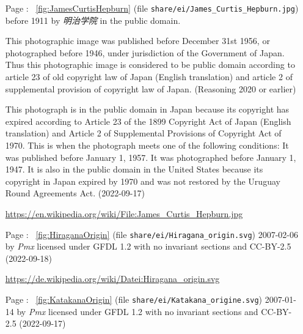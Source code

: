 \begin{itemize}

    \item[Page \pageref{fig:JamesCurtisHepburn}:] ~\ref{fig:JamesCurtisHepburn}
            \textit{} (file
            \texttt{share/ei/James\_Curtis\_Hepburn.jpg}) before 1911 by
            \textit{明治学院} in the public domain.

            This photographic image was published before December 31st 1956, or
            photographed before 1946, under jurisdiction of the Government of
            Japan. Thus this photographic image is considered to be public
            domain according to article 23 of old copyright law of Japan
            (English translation) and article 2 of supplemental provision of
            copyright law of Japan. (Reasoning 2020 or earlier)

            This photograph is in the public domain in Japan because its
            copyright has expired according to Article 23 of the 1899 Copyright
            Act of Japan (English translation) and Article 2 of Supplemental
            Provisions of Copyright Act of 1970. This is when the photograph
            meets one of the following conditions: It was published before
            January 1, 1957.  It was photographed before January 1, 1947.  It
            is also in the public domain in the United States because its
            copyright in Japan expired by 1970 and was not restored by the
            Uruguay Round Agreements Act. (2022-09-17)

            \url{https://en.wikipedia.org/wiki/File:James_Curtis_Hepburn.jpg}


    \item[Page \pageref{fig:HiraganaOrigin}:] ~\ref{fig:HiraganaOrigin}
            \textit{} (file \texttt{share/ei/Hiragana\_origin.svg}) 2007-02-06 by \textit{Pmx}
            licensed under GFDL 1.2 with no invariant sections and CC-BY-2.5
            (2022-09-18)

            \url{https://de.wikipedia.org/wiki/Datei:Hiragana_origin.svg}

    \item[Page \pageref{fig:KatakanaOrigin}:] ~\ref{fig:KatakanaOrigin}
            \textit{} (file
            \texttt{share/ei/Katakana\_origine.svg}) 2007-01-14 by \textit{Pmx}
            licensed under GFDL 1.2 with no invariant sections and CC-BY-2.5
            (2022-09-17)


\end{itemize}
